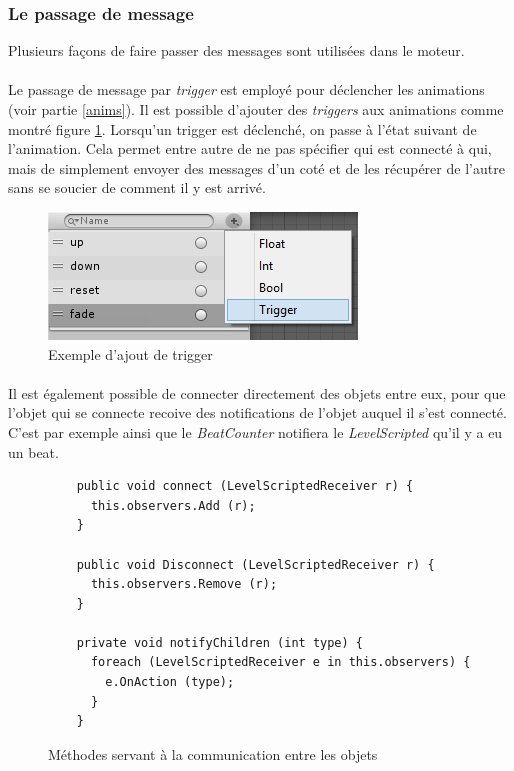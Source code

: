 \subsubsection{Le passage de message}
Plusieurs façons de faire passer des messages sont utilisées dans le moteur. 
\paragraph{}
Le passage de message par \textit{trigger} est employé pour déclencher les animations (voir partie \ref{anims}). Il est possible d'ajouter des \textit{triggers} aux animations comme montré figure \ref{trigger}. Lorsqu'un trigger est déclenché, on passe à l'état suivant de l'animation. Cela permet entre autre de ne pas spécifier qui est connecté à qui, mais de simplement envoyer des messages d'un coté et de les récupérer de l'autre sans se soucier de comment il y est arrivé.

\begin{figure}[H]\centering
  \includegraphics[scale=1]{./img/anims.png}
  \caption{Exemple d'ajout de trigger}
  \label{trigger}
\end{figure}

\paragraph{}
Il est également possible de connecter directement des objets entre eux, pour que l'objet qui se connecte recoive des notifications de l'objet auquel il s'est connecté. C'est par exemple ainsi que le \textit{BeatCounter} notifiera le \textit{LevelScripted} qu'il y a eu un beat.

\begin{figure}[H]\centering
  \begin{lstlisting}
    public void connect (LevelScriptedReceiver r) {
      this.observers.Add (r);
    }

    public void Disconnect (LevelScriptedReceiver r) {
      this.observers.Remove (r);
    }

    private void notifyChildren (int type) {
      foreach (LevelScriptedReceiver e in this.observers) {
        e.OnAction (type);
      }
    }
  \end{lstlisting}
\label{connection}
\caption{Méthodes servant à la communication entre les objets}
\end{figure}

